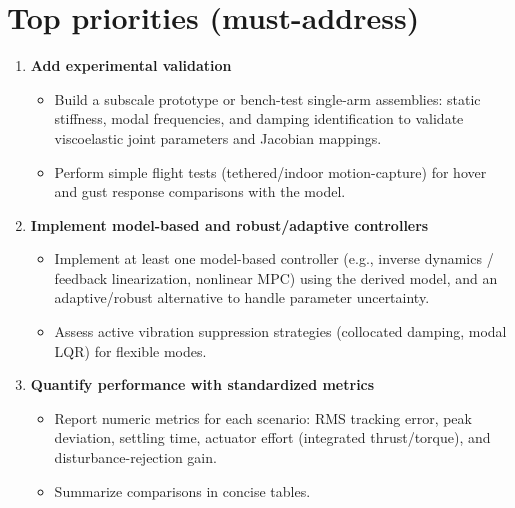 \documentclass[11pt,letterpaper]{article}
\begin{document}
\section*{Top priorities (must-address)}
\begin{enumerate}[left=0pt,label=\textbf{\arabic*.},wide=0pt]
  \item \textbf{Add experimental validation}
    \begin{itemize}
      \item Build a subscale prototype or bench-test single-arm assemblies: static stiffness, modal frequencies, and damping identification to validate viscoelastic joint parameters and Jacobian mappings.
      \item Perform simple flight tests (tethered/indoor motion-capture) for hover and gust response comparisons with the model.
    \end{itemize}

  \item \textbf{Implement model-based and robust/adaptive controllers}
    \begin{itemize}
      \item Implement at least one model-based controller (e.g., inverse dynamics / feedback linearization, nonlinear MPC) using the derived model, and an adaptive/robust alternative to handle parameter uncertainty.
      \item Assess active vibration suppression strategies (collocated damping, modal LQR) for flexible modes.
    \end{itemize}

  \item \textbf{Quantify performance with standardized metrics}
    \begin{itemize}
      \item Report numeric metrics for each scenario: RMS tracking error, peak deviation, settling time, actuator effort (integrated thrust/torque), and disturbance-rejection gain.
      \item Summarize comparisons in concise tables.
    \end{itemize}
\end{enumerate}
\end{document}
